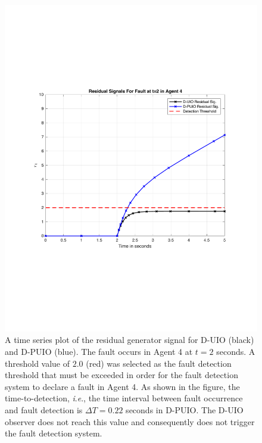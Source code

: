 \documentclass[letterpaper, 10 pt, conference]{ieeeconf}  %
\newcommand{\ie}{\textit{i}.\textit{e}., }
\begin{document}
 \begin{figure}
    \centering
    \includegraphics[scale=0.3]{residualSignalsAgent4}
    \caption{A time series plot of the residual generator signal for D-UIO (black) and D-PUIO (blue). The fault occurs in Agent 4 at $t=2$ seconds. A threshold value of $2.0$ (red) was selected as the fault detection threshold that must be exceeded in order for the fault detection system to declare a fault in Agent 4. As shown in the figure, the time-to-detection, \ie the time interval between fault occurrence and fault detection is $\Delta T = 0.22$ seconds in D-PUIO. The D-UIO observer does not reach this value and consequently does not trigger the fault detection system.}
    \label{fig:faultAgent4}
\end{figure}
\end{document}
